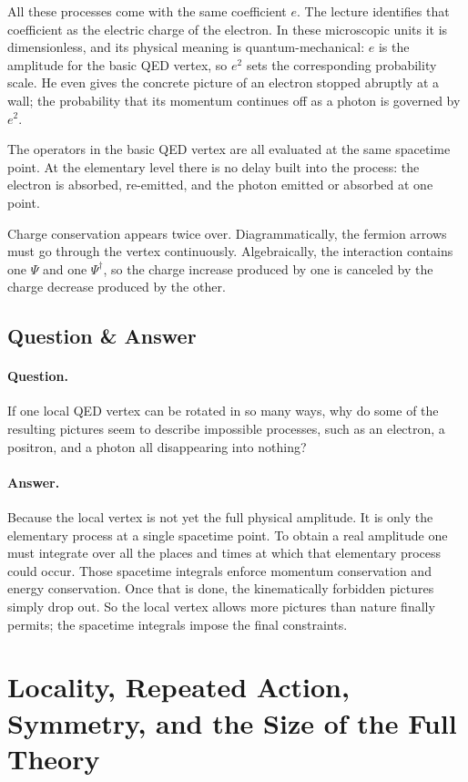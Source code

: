 All these processes come with the same coefficient \(e\). The lecture identifies that coefficient as the electric charge of the electron. In these microscopic units it is dimensionless, and its physical meaning is quantum-mechanical: \(e\) is the amplitude for the basic QED vertex, so \(e^2\) sets the corresponding probability scale. He even gives the concrete picture of an electron stopped abruptly at a wall; the probability that its momentum continues off as a photon is governed by \(e^2\).

The operators in the basic QED vertex are all evaluated at the same spacetime point. At the elementary level there is no delay built into the process: the electron is absorbed, re-emitted, and the photon emitted or absorbed at one point.

Charge conservation appears twice over. Diagrammatically, the fermion arrows must go through the vertex continuously. Algebraically, the interaction contains one \(\Psi\) and one \(\Psi^\dagger\), so the charge increase produced by one is canceled by the charge decrease produced by the other.

\subsection{Question \& Answer}

\paragraph{Question.}
If one local QED vertex can be rotated in so many ways, why do some of the resulting pictures seem to describe impossible processes, such as an electron, a positron, and a photon all disappearing into nothing?

\paragraph{Answer.}
Because the local vertex is not yet the full physical amplitude. It is only the elementary process at a single spacetime point. To obtain a real amplitude one must integrate over all the places and times at which that elementary process could occur. Those spacetime integrals enforce momentum conservation and energy conservation. Once that is done, the kinematically forbidden pictures simply drop out. So the local vertex allows more pictures than nature finally permits; the spacetime integrals impose the final constraints.

\section{Locality, Repeated Action, Symmetry, and the Size of the Full Theory}

